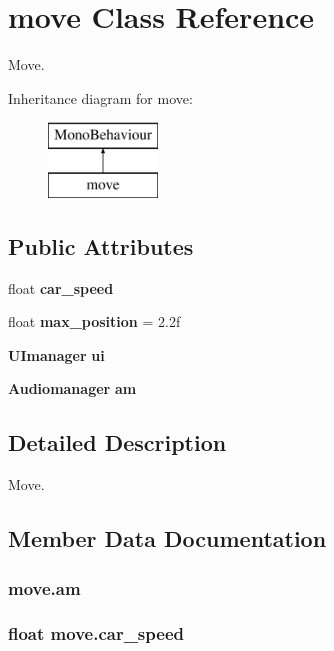 \section{move Class Reference}
\label{classmove}


Move.  


Inheritance diagram for move\+:\begin{figure}[H]
\begin{center}
\leavevmode
\includegraphics[height=2.000000cm]{classmove}
\end{center}
\end{figure}
\subsection*{Public Attributes}
\begin{DoxyCompactItemize}
\item 
float {\bf car\+\_\+speed}
\item 
float {\bf max\+\_\+position} = 2.\+2f
\item 
{\bf U\+Imanager} {\bf ui}
\item 
{\bf Audiomanager} {\bf am}
\end{DoxyCompactItemize}


\subsection{Detailed Description}
Move. 



\subsection{Member Data Documentation}
\subsubsection[{am}]{ move.\+am}\label{classmove_a0e2b57310a60178c64a9af3ab03e5dbf}
\subsubsection[{car\+\_\+speed}]{\setlength{\rightskip}{0pt plus 5cm}float move.\+car\+\_\+speed}\label{classmove_ad0b0f63ad3fa6009130a7cd8a0ba6d7e}
